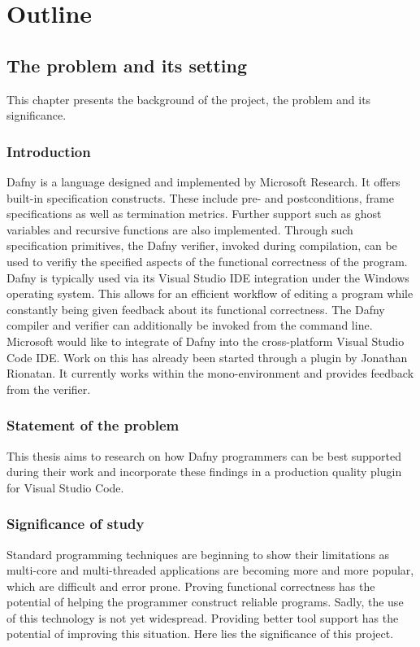 \section{Outline}
\subsection{The problem and its setting}
This chapter presents the background of the project, the problem and its significance.
\subsubsection{Introduction}
Dafny is a language designed and implemented by Microsoft Research. It offers built-in specification constructs. These include pre- and postconditions, frame specifications as well as termination metrics. Further support such as ghost variables and recursive functions are also implemented. Through such specification primitives, the Dafny verifier, invoked during compilation, can be used to verifiy the specified aspects of the functional correctness of the program. \newline
Dafny is typically used via its Visual Studio IDE integration under the Windows operating system. This allows for an efficient workflow of editing a program while constantly being given feedback about its functional correctness. The Dafny compiler and verifier can additionally be invoked from the command line. \newline
Microsoft would like to integrate of Dafny into the cross-platform Visual Studio Code IDE. Work on this has already been started through a plugin by Jonathan  Rionatan. It currently works within the mono-environment and provides feedback from the verifier. \newline

\subsubsection{Statement of the problem}
This thesis aims to research on how Dafny programmers can be best supported during their work and incorporate these findings in a production quality plugin for Visual Studio Code. 
\subsubsection{Significance of study}
Standard programming techniques are beginning to show their limitations as multi-core and multi-threaded applications are becoming more and more popular, which are difficult and error prone.
Proving functional correctness has the potential of helping the programmer construct reliable programs.
Sadly, the use of this technology is not yet widespread. Providing better tool support has the potential of improving this situation. Here lies the significance of this project.
